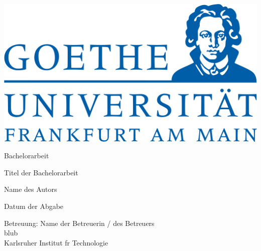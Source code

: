  \begin{titlepage}

    \includegraphics[scale=0.2]{pictures/logo.png}
    \vspace*{2cm} 

 \begin{center} \large 
    
    Bachelorarbeit
    \vspace*{2cm}

    {\huge Titel der Bachelorarbeit}
    \vspace*{2.5cm}

    Name des Autors
    \vspace*{1.5cm}

    Datum der Abgabe
    \vspace*{4.5cm}


    Betreuung: Name der Betreuerin / des Betreuers \\[1cm]
    blub \\[1cm]
		Karlsruher Institut fr Technologie
  \end{center}
\end{titlepage}